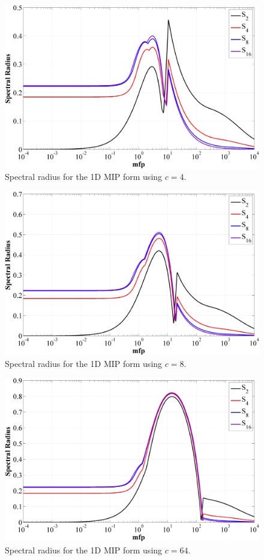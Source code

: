 \begin{figure}
\label{fig::1D_MIP_c=4}
\centering
\includegraphics[width=\textwidth]{figures/appendices/DSA_1D_SI_MIP_C=4.png}
\caption{Spectral radius for the 1D MIP form using $c=4$.}
\end{figure}

\begin{figure}
\label{fig::1D_MIP_c=8}
\centering
\includegraphics[width=\textwidth]{figures/appendices/DSA_1D_SI_MIP_C=8.png}
\caption{Spectral radius for the 1D MIP form using $c=8$.}
\end{figure}

\begin{figure}
\label{fig::1D_MIP_c=64}
\centering
\includegraphics[width=\textwidth]{figures/appendices/DSA_1D_SI_MIP_C=64.png}
\caption{Spectral radius for the 1D MIP form using $c=64$.}
\end{figure}

